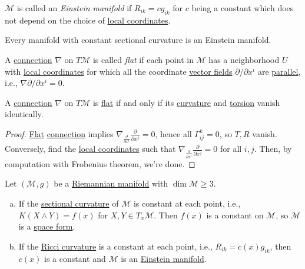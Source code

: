 \begin{definition}\label{def:Einstein-manifold}
	\(\mathcal{M} \) is called an \emph{Einstein manifold} if \(R_{ik} = c g_{ik} \) for \(c\) being a constant which does not depend on the choice of \hyperref[def:coordinate-chart]{local coordinates}.
\end{definition}

\begin{center}
\end{center}

\begin{remark}
	Every manifold with constant sectional curvature is an Einstein manifold.
\end{remark}

\begin{definition}[Flat]\label{def:connection-flat}
	A \hyperref[def:linear-connection]{connection} \(\nabla \) on \(T \mathcal{M} \) is called \emph{flat} if each point in \(\mathcal{M} \) has a neighborhood \(U\) with \hyperref[def:coordinate-chart]{local coordinates} for which all the coordinate \hyperref[def:vector-field]{vector fields} \(\partial / \partial x^i\) are \hyperref[def:parallel]{parallel}, i.e., \(\nabla \partial / \partial x^i = 0\).
\end{definition}

\begin{theorem}
	A \hyperref[def:linear-connection]{connection} \(\nabla \) on \(T \mathcal{M} \) is \hyperref[def:connection-flat]{flat} if and only if its \hyperref[def:Riemannian-curvature]{curvature} and \hyperref[def:torsion]{torsion} vanish identically.
\end{theorem}
\begin{proof}
	\hyperref[def:connection-flat]{Flat} \hyperref[def:linear-connection]{connection} implies \(\nabla _{\frac{\partial }{\partial x^i} } \frac{\partial }{\partial x^j} = 0\), hence all \(\Gamma ^k _{ij} = 0\), so \(T, R\) vanish. Conversely, find the \hyperref[def:coordinate-chart]{local coordinates} such that \(\nabla _{\frac{\partial }{\partial x^i} } \frac{\partial }{\partial x^j} = 0\) for all \(i, j\). Then, by computation with Frobenius theorem, we're done.
\end{proof}


\begin{theorem}\label{thm:Schur}
	Let \((\mathcal{M} , g)\) be a \hyperref[def:Riemannian-manifold]{Riemannian manifold} with \(\dim \mathcal{M} \geq 3\).
	\begin{enumerate}[(a)]
		\item If the \hyperref[def:sectional-curvature]{sectional curvature} of \(\mathcal{M} \) is constant at each point, i.e., \(K(X\wedge Y) = f(x)\) for \(X, Y\in T_x \mathcal{M} \). Then \(f(x)\) is a constant on \(\mathcal{M} \), so \(\mathcal{M} \) is a \hyperref[def:space-form]{space form}.
		\item If the \hyperref[def:Ricci-curvature]{Ricci curvature} is a constant at each point, i.e., \(R_{ik} = c(x) g_{ik}\), then \(c(x)\) is a constant and \(\mathcal{M} \) is an \hyperref[def:Einstein-manifold]{Einstein manifold}.
	\end{enumerate}
\end{theorem}

